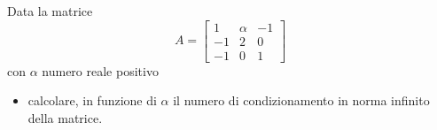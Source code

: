 Data la matrice
\[
A=\left[
\begin{array}{ccc}
1 & \alpha & -1 \\
-1 & 2 & 0\\
-1 & 0 & 1
\end{array}\right]
\]
 con $\alpha$ numero reale positivo
 \begin {itemize}
 \item calcolare, in funzione di  $\alpha$ il numero di condizionamento in norma infinito
 della matrice.
\end{itemize}
